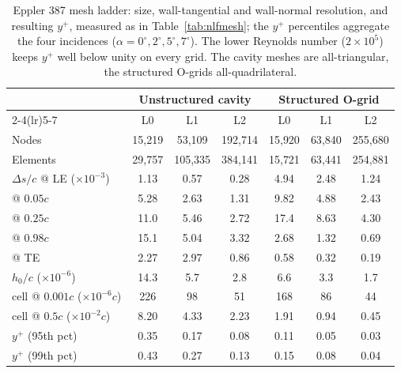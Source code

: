 \documentclass[journal]{new-aiaa}
\begin{document}
\begin{table}[tp]
  \centering
  \small
  \caption{Eppler 387 mesh ladder: size, wall-tangential and wall-normal
  resolution, and resulting $y^+$, measured as in Table~\ref{tab:nlfmesh}; the
  $y^+$ percentiles aggregate the four incidences
  ($\alpha\!=\!0^\circ,2^\circ,5^\circ,7^\circ$). The lower Reynolds number
  ($2\times10^5$) keeps $y^+$ well below unity on every grid. The cavity meshes
  are all-triangular, the structured O-grids all-quadrilateral.}
  \label{tab:eppmesh}
  \begin{tabular}{l cccccc}
    \toprule
    & \multicolumn{3}{c}{Unstructured cavity} & \multicolumn{3}{c}{Structured O-grid}\\
    \cmidrule(lr){2-4}\cmidrule(lr){5-7}
    & L0 & L1 & L2 & L0 & L1 & L2 \\
    \midrule
    Nodes    & 15{,}219 & 53{,}109 & 192{,}714 & 15{,}920 & 63{,}840 & 255{,}680 \\
    Elements & 29{,}757 & 105{,}335 & 384{,}141 & 15{,}721 & 63{,}441 & 254{,}881 \\
    \addlinespace
    $\Delta s/c$ @ LE ($\times10^{-3}$)      & 1.13 & 0.57 & 0.28 & 4.94 & 2.48 & 1.24 \\
    \quad @ $0.05c$                          & 5.28 & 2.63 & 1.31 & 9.82 & 4.88 & 2.43 \\
    \quad @ $0.25c$                          & 11.0 & 5.46 & 2.72 & 17.4 & 8.63 & 4.30 \\
    \quad @ $0.98c$                          & 15.1 & 5.04 & 3.32 & 2.68 & 1.32 & 0.69 \\
    \quad @ TE                               & 2.27 & 2.97 & 0.86 & 0.58 & 0.32 & 0.19 \\
    \addlinespace
    $h_0/c$ ($\times10^{-6}$)                & 14.3 & 5.7 & 2.8 & 6.6 & 3.3 & 1.7 \\
    cell @ $0.001c$ ($\times10^{-6}c$)       & 226 & 98 & 51 & 168 & 86 & 44 \\
    cell @ $0.5c$ ($\times10^{-2}c$)         & 8.20 & 4.33 & 2.23 & 1.91 & 0.94 & 0.45 \\
    \addlinespace
    $y^+$ (95th pct)                         & 0.35 & 0.17 & 0.08 & 0.11 & 0.05 & 0.03 \\
    $y^+$ (99th pct)                         & 0.43 & 0.27 & 0.13 & 0.15 & 0.08 & 0.04 \\
    \bottomrule
  \end{tabular}
\end{table}
\end{document}
